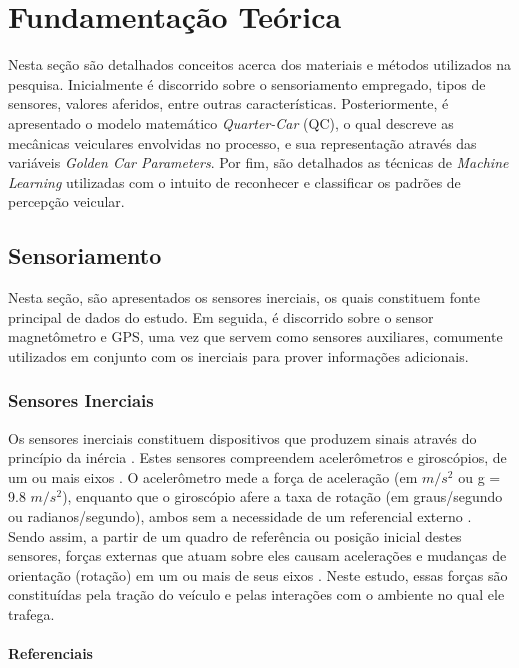 \chapter{Fundamentação Teórica}
\label{cap:fundamentacao}

Nesta seção são detalhados conceitos acerca dos materiais e métodos utilizados na pesquisa. Inicialmente é discorrido sobre o sensoriamento empregado, tipos de sensores, valores aferidos, entre outras características. Posteriormente, é apresentado o modelo matemático \textit{Quarter-Car} (QC), o qual descreve as mecânicas veiculares envolvidas no processo, e sua representação através das variáveis \textit{Golden Car Parameters}. Por fim, são detalhados as técnicas de \textit{Machine Learning} utilizadas com o intuito de reconhecer e classificar os padrões de percepção veicular.

\section{Sensoriamento}

Nesta seção, são apresentados os sensores inerciais, os quais constituem fonte principal de dados do estudo. Em seguida, é discorrido sobre o sensor magnetômetro e GPS, uma vez que servem como sensores auxiliares, comumente utilizados em conjunto com os inerciais para prover informações adicionais. 

\subsection{Sensores Inerciais}

Os sensores inerciais constituem dispositivos que produzem sinais através do princípio da inércia \cite{Braga2017}. Estes sensores compreendem acelerômetros e giroscópios, de um ou mais eixos \cite{Beeby2004}. O acelerômetro mede a força de aceleração (em $m/s^2$ ou g = 9.8 $m/s^2$), enquanto que o giroscópio afere a taxa de rotação (em graus/segundo ou radianos/segundo), ambos sem a necessidade de um referencial externo \cite{Groves2013}. Sendo assim, a partir de um quadro de referência ou posição inicial destes sensores, forças externas que atuam sobre eles causam acelerações e mudanças de orientação (rotação) em um ou mais de seus eixos \cite{Kempe2011}. Neste estudo, essas forças são constituídas pela tração do veículo e pelas interações com o ambiente no qual ele trafega.

\subsubsection{Referenciais}

